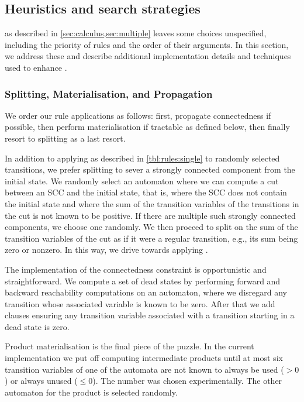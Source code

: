 
\subsection{Heuristics and search strategies}

\Calculus{} as described in \cref{sec:calculus,sec:multiple} leaves some choices
unspecified, including the priority of rules and the order of their arguments. In
this section, we address these and describe additional implementation details
and techniques used to enhance \Catra{}.

\subsubsection{Splitting, Materialisation, and Propagation}

We order our rule applications as follows: first, propagate connectedness if
possible, then perform materialisation if tractable as defined below, then
finally resort to splitting as a last resort.

In addition to applying \Split{} as described in \cref{tbl:rules:single} to
randomly selected transitions, we prefer splitting to sever a strongly connected
component from the initial state. We randomly select an automaton where we can
compute a cut between an SCC and the initial state, that is, where the SCC does
not contain the initial state and where the sum of the transition variables of
the transitions in the cut is not known to be positive. If there are multiple
such strongly connected components, we choose one randomly. We then proceed to
split on the sum of the transition variables of the cut as if it were a regular
transition, e.g., its sum being zero or nonzero. In this way, we drive \Calculus{}
towards applying \Propagate{}.

The implementation of the connectedness constraint is opportunistic and
straightforward. We compute a set of dead states by performing forward and
backward reachability computations on an automaton, where we disregard any
transition whose associated variable is known to be zero. After that we add
clauses ensuring any transition variable associated with a transition starting
in a dead state is zero.

Product materialisation is the final piece of the puzzle. In the current
implementation we put off computing intermediate products until at most six transition
variables of one of the automata are not known to always be used ($> 0$) or always unused ($\leq 0$). The
number was chosen experimentally. The other automaton for the product is
selected randomly.

